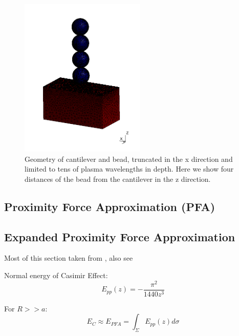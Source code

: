 \documentclass[11pt]{article}
\begin{document}
\begin{figure}[!h]
\centering
\includegraphics[height=3in]{geometry}
\caption{Geometry of cantilever and bead, truncated in the x direction and limited to tens of plasma wavelengths in depth. Here we show four distances of the bead from the cantilever in the z direction.}\label{fig:geo}
\end{figure}

\subsection{Proximity Force Approximation (PFA)}
\subsection{Expanded Proximity Force Approximation}
Most of this section taken from \citet{Dexp}, also see \citet{Bimonte12}

Normal energy of Casimir Effect:
$$
E_{pp}(z)=-\frac{\pi^2}{1440z^3}
$$

For $R>>a$:
$$
E_{C}\approx E_{PFA}=\int_{\Sigma}E_{pp}(z)d\sigma
$$
\end{document}
